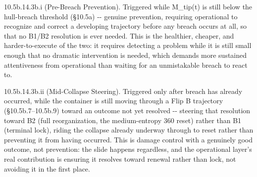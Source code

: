 \documentclass[
]{article}
\begin{document}
10.5b.14.3b.i (Pre-Breach Prevention). Triggered while M\_tip(t) is
still below the hull-breach threshold (§10.5a) -\/- genuine prevention,
requiring operational to recognize and correct a developing trajectory
before any breach occurs at all, so that no B1/B2 resolution is ever
needed. This is the healthier, cheaper, and harder-to-execute of the
two: it requires detecting a problem while it is still small enough that
no dramatic intervention is needed, which demands more sustained
attentiveness from operational than waiting for an unmistakable breach
to react to.

10.5b.14.3b.ii (Mid-Collapse Steering). Triggered only after breach has
already occurred, while the container is still moving through a Flip B
trajectory (§10.5b.7--10.5b.9) toward an outcome not yet resolved -\/-
steering that resolution toward B2 (full reorganization, the
medium-entropy 360 reset) rather than B1 (terminal lock), riding the
collapse already underway through to reset rather than preventing it
from having occurred. This is damage control with a genuinely good
outcome, not prevention: the slide happens regardless, and the
operational layer's real contribution is ensuring it resolves toward
renewal rather than lock, not avoiding it in the first place.
\end{document}
